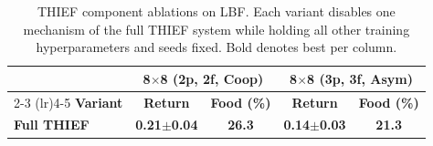 \begin{table}[t]
\centering
\caption{THIEF component ablations on LBF. Each variant disables one mechanism of the full THIEF system while holding all other training hyperparameters and seeds fixed. Bold denotes best per column.}
\label{tab:lbf_ablation}
\vspace{0.05in}
\footnotesize
\begin{tabular}{l cc cc}
\toprule
 & \multicolumn{2}{c}{\textbf{8$\times$8 (2p, 2f, Coop)}} & \multicolumn{2}{c}{\textbf{8$\times$8 (3p, 3f, Asym)}} \\
\cmidrule(lr){2-3} \cmidrule(lr){4-5}
\textbf{Variant} & \textbf{Return} & \textbf{Food (\%)} & \textbf{Return} & \textbf{Food (\%)} \\
\midrule
\textbf{Full THIEF} & \textbf{0.21\tiny$\pm$0.04} & \textbf{26.3} & \textbf{0.14\tiny$\pm$0.03} & \textbf{21.3} \\
\bottomrule
\end{tabular}
\end{table}
